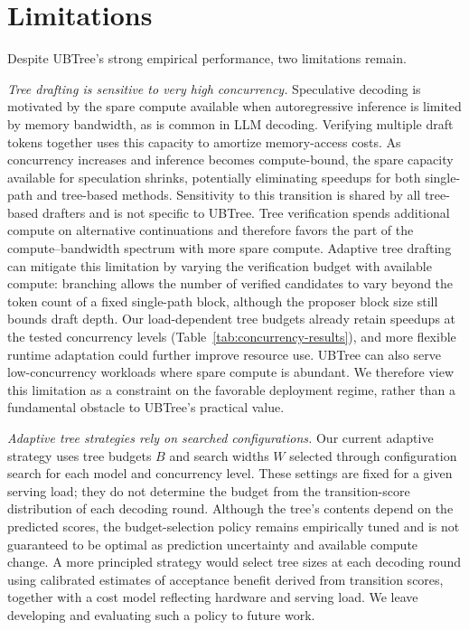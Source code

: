 \section{Limitations}
\label{app:limitations}
Despite UBTree's strong empirical performance, two limitations remain.

\noindent\textit{Tree drafting is sensitive to very high concurrency.}
Speculative decoding is motivated by the spare compute available when autoregressive inference is limited by memory bandwidth, as is common in LLM decoding. Verifying multiple draft tokens together uses this capacity to amortize memory-access costs. As concurrency increases and inference becomes compute-bound, the spare capacity available for speculation shrinks, potentially eliminating speedups for both single-path and tree-based methods. Sensitivity to this transition is shared by all tree-based drafters and is not specific to UBTree. Tree verification spends additional compute on alternative continuations and therefore favors the part of the compute--bandwidth spectrum with more spare compute. Adaptive tree drafting can mitigate this limitation by varying the verification budget with available compute: branching allows the number of verified candidates to vary beyond the token count of a fixed single-path block, although the proposer block size still bounds draft depth. Our load-dependent tree budgets already retain speedups at the tested concurrency levels (Table~\ref{tab:concurrency-results}), and more flexible runtime adaptation could further improve resource use. UBTree can also serve low-concurrency workloads where spare compute is abundant. We therefore view this limitation as a constraint on the favorable deployment regime, rather than a fundamental obstacle to UBTree's practical value.

\noindent\textit{Adaptive tree strategies rely on searched configurations.}
Our current adaptive strategy uses tree budgets $B$ and search widths $W$ selected through configuration search for each model and concurrency level. These settings are fixed for a given serving load; they do not determine the budget from the transition-score distribution of each decoding round. Although the tree's contents depend on the predicted scores, the budget-selection policy remains empirically tuned and is not guaranteed to be optimal as prediction uncertainty and available compute change. A more principled strategy would select tree sizes at each decoding round using calibrated estimates of acceptance benefit derived from transition scores, together with a cost model reflecting hardware and serving load. We leave developing and evaluating such a policy to future work.

